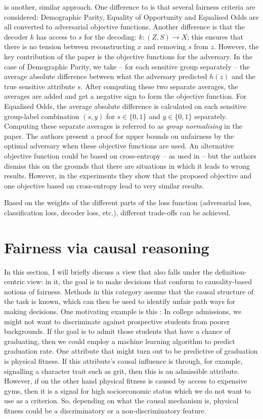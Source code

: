 \citet{madras2018learning} is another, similar approach. One difference to
\citet{edwards2016censoring} is that several fairness criteria are considered: Demographic Parity,
Equality of Opportunity and Equalised Odds are all converted to adversarial objective functions.
Another difference is that the decoder \(k\) has access to \(s\) for the decoding: \(k: (Z, S)\to
X\); this ensures that there is no tension between reconstructing \(x\) and removing \(s\) from
\(z\). However, the key contribution of the paper is the objective functions for the adversary. In
the case of Demographic Parity, we take -- for each sensitive group separately -- the average
absolute difference between what the adversary predicted \(h(z)\) and the true sensitive attribute
\(s\). After computing these two separate averages, the averages are added and get a negative sign
to form the objective function. For Equalised Odds, the average absolute difference is calculated
on each sensitive group-label combination \((s, y)\) for \(s \in \{0, 1\}\) and \(y \in \{0, 1\}\)
separately. Computing these separate averages is referred to as \emph{group normalising} in the
paper. The authors present a proof for upper bounds on unfairness by the optimal adversary when
these objective functions are used. An alternative objective function could be based on
cross-entropy -- as used in \citet{edwards2016censoring} -- but the authors dismiss this on the
grounds that there are situations in which it leads to wrong results. However, in the experiments
they show that the proposed objective and one objective based on cross-entropy lead to very similar
results.

Based on the weights of the different parts of the loss function (adversarial loss, classification
loss, decoder loss, etc.), different trade-offs can be achieved.

\section{Fairness via causal reasoning}%
In this section, I will briefly discuss a view that also falls under the definition-centric view:
in it, the goal is to make decisions that conform to causality-based notions of fairness. Methods
in this category assume that the causal structure of the task is known, which can then be used to
identify unfair path ways for making decisions. One motivating example is this
\citep{dedeo2014wrong}: In college admissions, we might not want to discriminate against
prospective students from poorer backgrounds. If the goal is to admit those students that have a
chance of graduating, then we could employ a machine learning algorithm to predict graduation rate.
One attribute that might turn out to be predictive of graduation is physical fitness. If this
attribute's causal influence is through, for example, signalling a character trait such as grit,
then this is an admissible attribute. However, if on the other hand physical fitness is caused by
access to expensive gyms, then it is a signal for high socioeconomic status which we do not want to
use as a criterion. So, depending on what the causal mechanism is, physical fitness could be a
discriminatory or a non-discriminatory feature.

